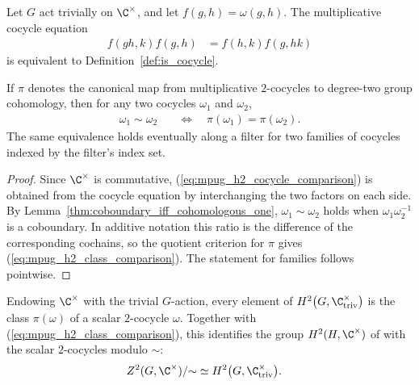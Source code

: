 \begin{lemma}
    \label{thm:mpug_h2_trivial_coefficients}
    \leanok
    Let $G$ act trivially on $\C^\times$, and let
    $f(g,h)=\omega(g,h)$. The multiplicative cocycle equation
    \begin{align}
        f(gh,k)f(g,h)
         & =f(h,k)f(g,hk)
        \label{eq:mpug_h2_cocycle_comparison}
    \end{align}
    is equivalent to Definition~\ref{def:is_cocycle}.

    If $\pi$ denotes the canonical map from multiplicative $2$-cocycles to
    degree-two group cohomology, then for any two cocycles $\omega_1$ and
    $\omega_2$,
    \begin{align}
        \omega_1\sim\omega_2
         & \quad\Longleftrightarrow\quad
        \pi(\omega_1)=\pi(\omega_2).
        \label{eq:mpug_h2_class_comparison}
    \end{align}
    The same equivalence holds eventually along a filter for two families of
    cocycles indexed by the filter's index set.
\end{lemma}

\begin{proof}\leanok
    Since $\C^\times$ is commutative,
    (\ref{eq:mpug_h2_cocycle_comparison}) is obtained from the cocycle
    equation by interchanging the two factors on each side.
    By Lemma~\ref{thm:coboundary_iff_cohomologous_one},
    $\omega_1\sim\omega_2$ holds when $\omega_1\omega_2^{-1}$ is a
    coboundary. In additive notation this ratio is the difference of the
    corresponding cochains, so the quotient criterion for $\pi$ gives
    (\ref{eq:mpug_h2_class_comparison}). The statement for families follows
    pointwise.
\end{proof}

\begin{lemma}
    \label{thm:mpug_h2_group_cohomology_comparison}
    \leanok
    Endowing $\C^\times$ with the trivial $G$-action, every element of
    $H^2\bigl(G,\C^\times_{\mathrm{triv}}\bigr)$ is the class $\pi(\omega)$ of
    a scalar $2$-cocycle $\omega$. Together with
    (\ref{eq:mpug_h2_class_comparison}), this identifies the group
    $H^2(H,\C^\times)$ of \cite[lines~1927--1931]{FrancoRubio2025MPUGauging}
    with the scalar $2$-cocycles modulo $\sim$:
    \begin{align}
        Z^2(G,\C^\times)/{\sim}
         & \simeq H^2\bigl(G,\C^\times_{\mathrm{triv}}\bigr).
        \label{eq:mpug_h2_equivalence}
    \end{align}
\end{lemma}

